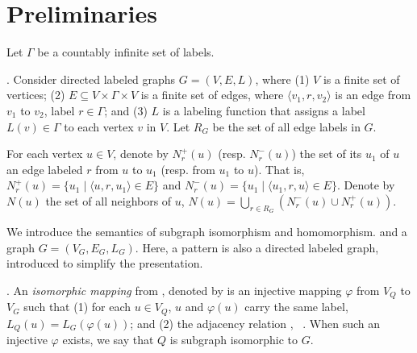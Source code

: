 \section{Preliminaries}
\label{sec-pre}
Let $\Gamma$ be a countably 
infinite set of labels.

. 
Consider directed labeled graphs $G=(V, E, L)$,
where (1) $V$ is a finite set of vertices;
(2) $E\subseteq V\times \Gamma \times V $ is a finite set 
of edges, 
where $\langle v_1, r, v_2\rangle$ is an edge
from $v_1$ to $v_2$,  
 label $r\in \Gamma$;
and (3) $L$ is a labeling function that 
assigns a label $L(v) \in \Gamma$
to each vertex $v$ in $V$.
Let $R_G$ be the set of all edge labels in $G$.

For each vertex $u {\in} V$, 
denote by $N^+_r(u)$ (resp. $N^-_r(u)$) the set of 
its   $u_1$ of $u$
 an  
edge labeled $r$ from $u$ to $u_1$
(resp.  
from $u_1$ to $u$).
That is, $N^+_r(u) {=} \{u_1\mid \langle u, r, u_1\rangle {\in} E\}$
and $N^-_r(u) {=} \{u_1\mid \langle u_1, r, u\rangle {\in} E\}$.
Denote by $N(u)$ the set of all neighbors of $u$, 
\ie $N(u) {=} \bigcup_{r\in R_G} (N^-_r(u) \cup N^+_r(u))$.

 

We introduce the semantics of 
subgraph
isomorphism and homomorphism.
 and a graph $G {=} (V_G, E_G, L_G)$.
Here, a pattern is also a directed 
labeled graph, introduced
to simplify the presentation.  

 
.
An \textit{isomorphic mapping} from  
,
denoted by 
 is an injective mapping $\varphi$
from $V_Q$ to $V_G$  
such that
(1) for each $u{\in} V_Q$, $u$ and $\varphi(u)$ 
carry the same label, \ie $L_Q(u) = L_G(\varphi(u))$; and
(2) the adjacency relation ,  
\ie~. 
When such an injective $\varphi$ exists, 
we say that $Q$ is subgraph isomorphic to $G$. 
 
 